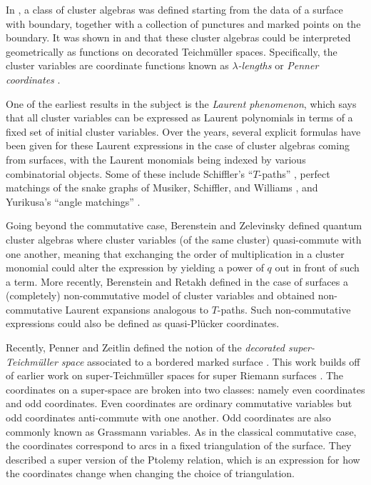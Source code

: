 \documentclass[pdftex]{sigma}
\numberwithin{equation}{section}
\begin{document}
In \cite{fst_08}, a class of cluster algebras was defined starting from the data of a surface with boundary, together with
a collection of punctures and marked points on the boundary. It was shown in \cite{gsv_05} and \cite{fg_06} that these
cluster algebras could be interpreted geometrically as functions on decorated Teichm\"{u}ller spaces.
Specifically, the cluster variables are coordinate functions known as \emph{$\lambda$-lengths} or \emph{Penner coordinates} \cite{penner_12}.

One of the earliest results in the subject is the \emph{Laurent phenomenon}, which says that all cluster variables
can be expressed as Laurent polynomials in terms of a fixed set of initial cluster variables. Over the years, several
explicit formulas have been given for these Laurent expressions in the case of cluster algebras coming from surfaces,
with the Laurent monomials being indexed by various combinatorial objects.
Some of these include Schiffler's ``$T$-paths'' \cite{schiffler_08}, perfect matchings of the snake graphs of Musiker, Schiffler, and Williams \cite{msw_11},
and Yurikusa's ``angle matchings'' \cite{yurikusa_19}.

Going beyond the commutative case, Berenstein and Zelevinsky defined quantum cluster algebras \cite{berenstein2005quantum}
where cluster variables (of the same cluster) quasi-commute with one another, meaning that exchanging the order of multiplication
in a cluster monomial could alter the expression by yielding a power of $q$ out in front of such a term.
More recently, Berenstein and Retakh \cite{berenstein2018noncommutative} defined in the case of surfaces a (completely) non-commutative
model of cluster variables and obtained non-commutative Laurent expansions analogous to $T$-paths.
Such non-commutative expressions could also be defined as quasi-Pl\"ucker coordinates.

Recently, Penner and Zeitlin defined the notion of the \emph{decorated super-Teichm\"{u}ller space} associated to a bordered marked surface \cite{pz_19}.
This work builds off of earlier work on super-Teichm\"uller spaces for super Riemann surfaces \cite{cr_88}.
The coordinates on a super-space are broken into two classes: namely even coordinates and odd coordinates.
Even coordinates are ordinary commutative variables but odd coordinates anti-commute with one another.
Odd coordinates are also commonly known as Grassmann variables. As in the classical commutative case, the coordinates correspond to arcs in a fixed triangulation of the surface.
They described a super version of the Ptolemy relation, which is an expression for how the coordinates change
when changing the choice of triangulation.
\end{document}
